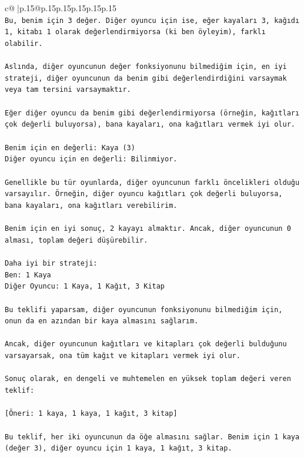 \documentclass{article}
\begin{document}
{\begin{supertabular}{c@{$\;$}|p{.15\linewidth}@{}p{.15\linewidth}p{.15\linewidth}p{.15\linewidth}p{.15\linewidth}p{.15\linewidth}}
{{{\\ 
\texttt{Bu, benim için 3 değer. Diğer oyuncu için ise, eğer kayaları 3, kağıdı 1, kitabı 1 olarak değerlendirmiyorsa (ki ben öyleyim), farklı olabilir.} \\
\\ 
\texttt{Aslında, diğer oyuncunun değer fonksiyonunu bilmediğim için, en iyi strateji, diğer oyuncunun da benim gibi değerlendirdiğini varsaymak veya tam tersini varsaymaktır.} \\
\\ 
\texttt{Eğer diğer oyuncu da benim gibi değerlendirmiyorsa (örneğin, kağıtları çok değerli buluyorsa), bana kayaları, ona kağıtları vermek iyi olur.} \\
\\ 
\texttt{Benim için en değerli: Kaya (3)} \\
\texttt{Diğer oyuncu için en değerli: Bilinmiyor.} \\
\\ 
\texttt{Genellikle bu tür oyunlarda, diğer oyuncunun farklı öncelikleri olduğu varsayılır. Örneğin, diğer oyuncu kağıtları çok değerli buluyorsa, bana kayaları, ona kağıtları verebilirim.} \\
\\ 
\texttt{Benim için en iyi sonuç, 2 kayayı almaktır. Ancak, diğer oyuncunun 0 alması, toplam değeri düşürebilir.} \\
\\ 
\texttt{Daha iyi bir strateji:} \\
\texttt{Ben: 1 Kaya} \\
\texttt{Diğer Oyuncu: 1 Kaya, 1 Kağıt, 3 Kitap} \\
\\ 
\texttt{Bu teklifi yaparsam, diğer oyuncunun fonksiyonunu bilmediğim için, onun da en azından bir kaya almasını sağlarım.} \\
\\ 
\texttt{Ancak, diğer oyuncunun kağıtları ve kitapları çok değerli bulduğunu varsayarsak, ona tüm kağıt ve kitapları vermek iyi olur.} \\
\\ 
\texttt{Sonuç olarak, en dengeli ve muhtemelen en yüksek toplam değeri veren teklif:} \\
\\ 
\texttt{{[}Öneri: 1 kaya, 1 kaya, 1 kağıt, 3 kitap{]}} \\
\\ 
\texttt{Bu teklif, her iki oyuncunun da öğe almasını sağlar. Benim için 1 kaya (değer 3), diğer oyuncu için 1 kaya, 1 kağıt, 3 kitap.} \\
}}}
\end{supertabular}}
\end{document}
